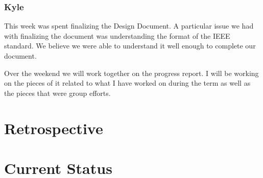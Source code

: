 \documentclass[letterpaper,10pt,serif, draftclsnofoot,onecolumn, compsoc, titlepage]{IEEEtran}
\begin{document}
\subsubsection{Kyle}
This week was spent finalizing the Design Document. A particular issue we had with finalizing the document was understanding the format of the IEEE standard. We believe we were able to understand it well enough to complete our document.

Over the weekend we will work together on the progress report. I will be working on the pieces of it related to what I have worked on during the term as well as the pieces that were group efforts.
\section{Retrospective}
\section{Current Status}
\end{document}
